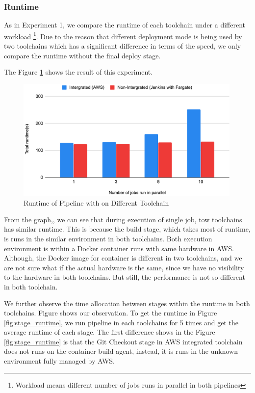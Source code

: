 \subsubsection{Runtime}
As in Experiment 1, we compare the runtime of each toolchain under a different workload \footnote{Workload means different number of jobs runs in parallel in both pipelines}. Due to the reason that different deployment mode is being used by two toolchains which has a significant difference in terms of the speed, we only compare the runtime without the final deploy stage. 
\par
The Figure \ref{fig:compareaws} shows the result of this experiment. 
\begin{figure}[h]
    \centering
    \includegraphics[width=0.99\textwidth]{pics/compare-aws.png}
    \caption{Runtime of Pipeline with on Different Toolchain}
    \label{fig:compareaws}
    \end{figure}
From the graph,, we can see that during execution of single job, tow toolchains has similar runtime. This is because the build stage, which takes most of runtime, is runs in the similar environment in both toolchains. Both execution environment is within a Docker container runs with same hardware in AWS. Although, the Docker image for container is different in two toolchains, and we are not sure what if the actual hardware is the same, since we have no visibility to the hardware in both toolchains. But still, the performance is not so different in both toolchain.
\par
We further observe the time allocation between stages within the runtime in both toolchains. Figure shows our observation. To get the runtime in Figure \ref{fig:stage_runtime}, we run pipeline in each toolchains for 5 times and get the average runtime of each stage. The first difference shows in the Figure \ref{fig:stage_runtime} is that the Git Checkout stage in AWS integrated toolchain does not runs on the container build agent, instead, it is runs in the unknown environment fully managed by AWS.
